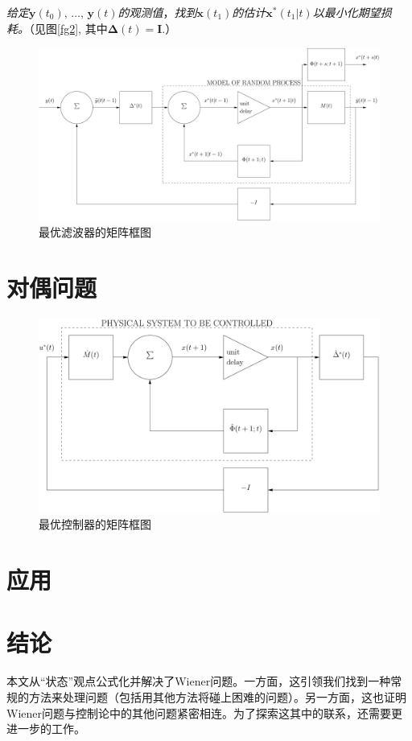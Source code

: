 \documentclass[UTF8,adobefonts]{ctexart}
\begin{document}
\emph{给定}$\mathbf{y}(t_0)\text{, }\dotsc\text{, }\mathbf{y}(t)$\emph{的观测值}，\emph{找到}$\mathbf{x}(t_1)$\emph{的估计}$\mathbf{x}^\ast (t_1 \vert t)$\emph{以最小化期望损耗。}（见图\ref{fg2}, 其中$\boldsymbol{\Delta}(t)=\mathbf{I}$.）


\begin{figure}[htbp]
\centering
\includegraphics[width=0.5\paperwidth]{fig/fg3.pdf}
\caption{最优滤波器的矩阵框图}
\label{fg3}
\end{figure}

\section{对偶问题}
\begin{figure}[htbp]
\centering
\includegraphics[width=0.5\paperwidth]{fig/fg4.pdf}
\caption{最优控制器的矩阵框图}
\label{fg4}
\end{figure}

\section{应用}
\section{结论}
本文从“状态”观点公式化并解决了Wiener问题。一方面，这引领我们找到一种常规的方法来处理问题（包括用其他方法将碰上困难的问题）。另一方面，这也证明Wiener问题与控制论中的其他问题紧密相连。为了探索这其中的联系，还需要更进一步的工作。
\end{document}
